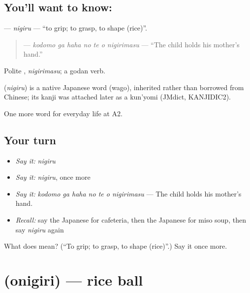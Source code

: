 \subsection*{You'll want to know: }
\textbf{} — \emph{nigiru} — \textquotedblleft{}to grip; to grasp, to shape (rice)\textquotedblright{}.

\begin{quote}
\textbf{   } — \emph{kodomo ga haha no te o nigirimasu} — \textquotedblleft{}The child holds his mother's hand.\textquotedblright{}
\end{quote}

Polite \textbf{}, \emph{nigirimasu}; a godan verb.

\begin{cousinweb}
\textbf{} (\emph{nigiru}) is a native Japanese word (wago), inherited rather than borrowed from Chinese; its kanji was attached later as a kun'yomi (JMdict, KANJIDIC2).
\end{cousinweb}

\begin{grammarlens}[title={What you've built}]
One more word for everyday life at A2.
\end{grammarlens}

\subsection*{Your turn}
\begin{itemize}
\raggedright
  \item \emph{Say it:} \emph{nigiru}
  \item \emph{Say it:} \emph{nigiru}, once more
  \item \emph{Say it:} \emph{kodomo ga haha no te o nigirimasu} — The child holds his mother's hand.
  \item \emph{Recall:} say the Japanese for cafeteria, then the Japanese for miso soup, then say \emph{nigiru} again
\end{itemize}

\begin{tcolorbox}[breakable,colback=teal!4,colframe=teal!35!black,title={Before you move on}]
What does  mean? (\textquotedblleft{}To grip; to grasp, to shape (rice)\textquotedblright{}.) Say it once more.
\end{tcolorbox}
\section[\texorpdfstring{\ja{おにぎり} (onigiri)}{おにぎり (onigiri)}]{ (onigiri) — rice ball}


